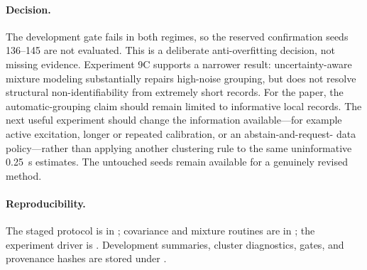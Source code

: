 \paragraph{Decision.}
The development gate fails in both regimes, so the reserved confirmation seeds
136--145 are not evaluated. This is a deliberate anti-overfitting decision, not
missing evidence. Experiment 9C supports a narrower result: uncertainty-aware
mixture modeling substantially repairs high-noise grouping, but does not resolve
structural non-identifiability from extremely short records. For the paper, the
automatic-grouping claim should remain limited to informative local records.
The next useful experiment should change the information available---for example
active excitation, longer or repeated calibration, or an abstain-and-request-
data policy---rather than applying another clustering rule to the same
uninformative 0.25~s estimates. The untouched seeds remain available for a
genuinely revised method.

\paragraph{Reproducibility.}
The staged protocol is in ; covariance and
mixture routines are in
; the experiment driver
is . Development
summaries, cluster diagnostics, gates, and provenance hashes are stored under
.
